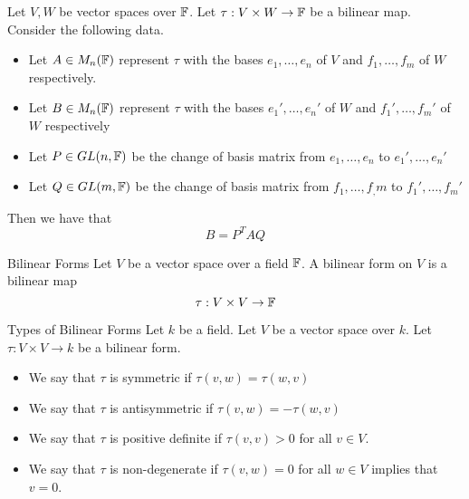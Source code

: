 \documentclass[a4paper]{article}
\begin{document}
\begin{prp}{}{} Let $V,W$ be vector spaces over $\mathbb{F}$. Let $\tau:V\times W\to\mathbb{F}$ be a bilinear map. Consider the following data. 
\begin{itemize}
\item Let $A\in M_n(\mathbb{F})$ represent $\tau$ with the bases $e_1,\dots,e_n$ of $V$ and $f_1,\dots,f_m$ of $W$ respectively. 
\item Let $B\in M_n(\mathbb{F})$ represent $\tau$ with the bases $e_1',\dots,e_n'$ of $W$ and $f_1',\dots,f_m'$ of $W$ respectively
\item Let $P\in GL(n,\mathbb{F})$ be the change of basis matrix from $e_1,\dots,e_n$ to $e_1',\dots,e_n'$
\item Let $Q\in GL(m,\mathbb{F})$ be the change of basis matrix from $f_1,\dots,f_,m$ to $f_1',\dots,f_m'$
\end{itemize}
Then we have that $$B=P^TAQ$$
\end{prp}

\begin{defn}{Bilinear Forms}{} Let $V$ be a vector space over a field $\mathbb{F}$. A bilinear form on $V$ is a bilinear map $$\tau:V\times V\to\mathbb{F}$$
\end{defn}

\begin{defn}{Types of Bilinear Forms}{} Let $k$ be a field. Let $V$ be a vector space over $k$. Let $\tau:V\times V\to k$ be a bilinear form. 
\begin{itemize}
\item We say that $\tau$ is symmetric if $\tau(v,w)=\tau(w,v)$
\item We say that $\tau$ is antisymmetric if $\tau(v,w)=-\tau(w,v)$
\item We say that $\tau$ is positive definite if $\tau(v,v)>0$ for all $v\in V$. 
\item We say that $\tau$ is non-degenerate if $\tau(v,w)=0$ for all $w\in V$ implies that $v=0$. 
\end{itemize}
\end{defn}
\end{document}
